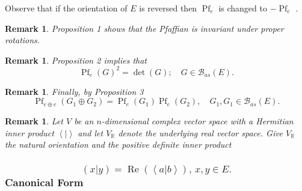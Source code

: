 \documentclass[aps,preprint]{revtex4}%
\newtheorem{remark}[theorem]{Remark}
\begin{document}
Observe that if the orientation of $E$ is reversed then $\operatorname{Pf}%
_{e}$ is changed to $-\operatorname{Pf}_{e}$ .

\begin{remark}
Proposition 1 shows that the Pfaffian is invariant under proper rotations.
\end{remark}

\begin{remark}
Proposition 2 implies that%
\begin{equation}
\operatorname{Pf}_{e}\left(  G\right)  ^{2}=\det\left(  G\right)  ;\quad
G\in\mathcal{B}_{as}\left(  E\right)  .
\end{equation}

\end{remark}

\begin{remark}
Finally, by Proposition 3%
\begin{equation}
\operatorname{Pf}_{e\oplus e}\left(  G_{1}\oplus G_{2}\right)
=\operatorname{Pf}_{e}\left(  G_{1}\right)  \operatorname{Pf}_{e}\left(
G_{2}\right)  ,\quad G_{1},G_{1}\in\mathcal{B}_{as}\left(  E\right)  .
\end{equation}

\end{remark}

\begin{remark}
Let $V$ be an $n$-dimensional complex vector space with a Hermitian inner
product $\left\langle \left.  {}\right\vert \right\rangle $ and let
$V_{\mathbb{R}}$ denote the underlying real vector space. Give $V_{\mathbb{R}%
}$ the natural orientation and the positive definite inner product
\end{remark}

\subsubsection{%
\begin{equation}
(\left.  x\right\vert y)=\operatorname{Re}\left(  \left\langle \left.
a\right\vert b\right\rangle \right)  ,\,x,y\in E.
\end{equation}
Canonical Form}
\end{document}
